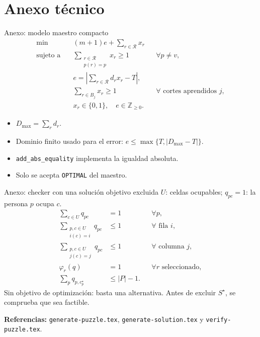 \documentclass[aspectratio=169,11pt]{beamer}
\begin{document}
\appendix
\section{Anexo t\'ecnico}

\begin{frame}{Anexo: modelo maestro compacto}
  \small
  \[
    \begin{aligned}
      \min\quad &(m+1)e+\sum_{r\in\mathcal R}x_r\\
      \text{sujeto a}\quad
      &\sum_{\substack{r\in\mathcal R\\p(r)=p}}x_r\geq1
        &&\forall p\neq v,\\
      &e=\left|\sum_{r\in\mathcal R}d_rx_r-T\right|,\\
      &\sum_{r\in B_j}x_r\geq1
        &&\forall\text{ cortes aprendidos }j,\\
      &x_r\in\{0,1\},\quad e\in\mathbb Z_{\geq0}.
    \end{aligned}
  \]
  \begin{itemize}
    \item \(D_{\max}=\sum_r d_r\).
    \item Dominio finito usado para el error:
      \(e\leq\max\{T,|D_{\max}-T|\}\).
    \item \texttt{add\_abs\_equality} implementa la igualdad absoluta.
    \item Solo se acepta \texttt{OPTIMAL} del maestro.
  \end{itemize}
\end{frame}

\begin{frame}{Anexo: checker con una soluci\'on objetivo excluida}
  \small
  \(U\): celdas ocupables;\quad
  \(q_{pc}=1\): la persona \(p\) ocupa \(c\).
  \[
    \begin{aligned}
      \sum_{c\in U}q_{pc}&=1 &&\forall p,\\
      \sum_{\substack{p,c\in U\\i(c)=i}}q_{pc}&\leq1
        &&\forall\text{ fila }i,\\
      \sum_{\substack{p,c\in U\\j(c)=j}}q_{pc}&\leq1
        &&\forall\text{ columna }j,\\
      \varphi_r(q)&=1 &&\forall r\text{ seleccionado},\\
      \sum_p q_{p,c_p^\star}&\leq |P|-1.
    \end{aligned}
  \]
  Sin objetivo de optimizaci\'on: basta una alternativa.
  Antes de excluir \(S^\star\), se comprueba que sea factible.
  \par\medskip
  \textbf{Referencias:}
  \texttt{generate-puzzle.tex},
  \texttt{generate-solution.tex} y
  \texttt{verify-puzzle.tex}.
\end{frame}
\end{document}
